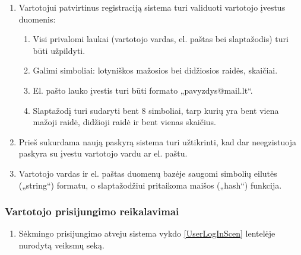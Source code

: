 \documentclass[12pt]{article}
\begin{document}
	\begin{enumerate}[resume, labelindent=10pt,leftmargin=2.2cm]
		\item\label{Validation} Vartotojui patvirtinus registraciją sistema turi validuoti vartotojo įvestus duomenis:
		
		\begin{enumerate}[label=\theenumi.\arabic{enumii}]
			\item Visi privalomi laukai (vartotojo vardas, el. paštas bei slaptažodis) turi būti užpildyti.
			\item Galimi simboliai: lotyniškos mažosios bei didžiosios raidės, skaičiai.
			\item El. pašto lauko įvestis turi būti formato „pavyzdys@mail.lt“.
			\item Slaptažodį turi sudaryti bent 8 simboliai, tarp kurių yra bent viena mažoji raidė, didžioji raidė ir bent vienas skaičius.
		\end{enumerate}	
		
		\item Prieš sukurdama naują paskyrą sistema turi užtikrinti, kad dar neegzistuoja paskyra su įvestu vartotojo vardu ar el. paštu.
		\item Vartotojo vardas ir el. paštas duomenų bazėje saugomi simbolių eilutės („string“) formatu, o slaptažodžiui pritaikoma maišos („hash“) funkcija.
	\end{enumerate}	
	\pagebreak
	
	\subsubsection{Vartotojo prisijungimo reikalavimai\label{LogInLabel}}
	\begin{enumerate}[labelindent=10pt,leftmargin=2.2cm]
		\item Sėkmingo prisijungimo atveju sistema vykdo \ref{UserLogInScen} lentelėje nurodytą veiksmų seką.
	\end{enumerate}
		
\end{document}
